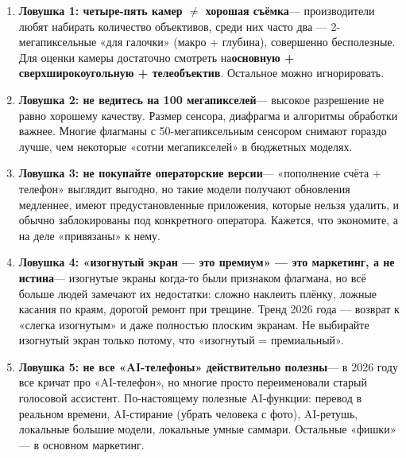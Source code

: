 
\begin{enumerate}
  \item \textbf{Ловушка 1: четыре-пять камер $\neq$ хорошая съёмка}— производители любят набирать количество объективов, среди них часто два — 2-мегапиксельные «для галочки» (макро + глубина), совершенно бесполезные. Для оценки камеры достаточно смотреть на\textbf{основную + сверхширокоугольную + телеобъектив}. Остальное можно игнорировать.
  \item \textbf{Ловушка 2: не ведитесь на 100 мегапикселей}— высокое разрешение не равно хорошему качеству. Размер сенсора, диафрагма и алгоритмы обработки важнее. Многие флагманы с 50-мегапиксельным сенсором снимают гораздо лучше, чем некоторые «сотни мегапикселей» в бюджетных моделях.
  \item \textbf{Ловушка 3: не покупайте операторские версии}— «пополнение счёта + телефон» выглядит выгодно, но такие модели получают обновления медленнее, имеют предустановленные приложения, которые нельзя удалить, и обычно заблокированы под конкретного оператора. Кажется, что экономите, а на деле «привязаны» к нему.
  \item \textbf{Ловушка 4: «изогнутый экран — это премиум» — это маркетинг, а не истина}— изогнутые экраны когда-то были признаком флагмана, но всё больше людей замечают их недостатки: сложно наклеить плёнку, ложные касания по краям, дорогой ремонт при трещине. Тренд 2026 года — возврат к «слегка изогнутым» и даже полностью плоским экранам. Не выбирайте изогнутый экран только потому, что «изогнутый = премиальный».
  \item \textbf{Ловушка 5: не все «AI-телефоны» действительно полезны}— в 2026 году все кричат про «AI-телефон», но многие просто переименовали старый голосовой ассистент. По-настоящему полезные AI-функции: перевод в реальном времени, AI-стирание (убрать человека с фото), AI-ретушь, локальные большие модели, локальные умные саммари. Остальные «фишки» — в основном маркетинг.
\end{enumerate}


